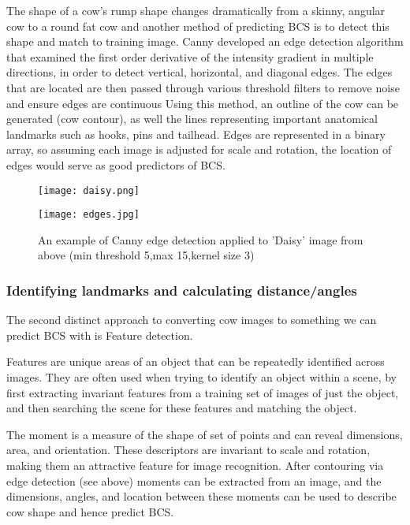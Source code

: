 \documentclass[11pt]{article}
\begin{document}
	The shape of a cow's rump shape changes dramatically from a skinny, angular cow to a round fat cow and another method of predicting BCS is to detect this shape and match to training image.
	Canny developed an edge detection algorithm that examined the first order derivative of the intensity gradient in multiple directions, in order to detect vertical, horizontal, and diagonal edges\cite{Canny1986}.
	The edges that are located are then passed through various threshold filters to remove noise and ensure edges are continuous
	Using this method, an outline of the cow can be generated (cow contour), as well the lines representing important anatomical landmarks such as hooks, pins and tailhead.
	Edges are represented in a binary array, so assuming each image is adjusted for scale and rotation, the location of edges would serve as good predictors of BCS.


	\begin{figure}[h!]
		\centering
		\parbox{5cm}{\texttt{[image: daisy.png]}}
		\parbox{6cm}{\texttt{[image: edges.jpg]}}
		\caption{An example of Canny edge detection applied to 'Daisy' image from above (min threshold 5,max 15,kernel size 3) }
		\label{fig:}
	\end{figure}
\newpage


	\subsubsection{Identifying landmarks and calculating distance/angles}

	The second distinct approach to converting cow images to something we can predict BCS with is Feature detection.


	Features are unique areas of an object that can be repeatedly identified across images.
	They are often used when trying to identify an object within a scene, by first extracting invariant features from a training set of images of just the object, and then searching the scene for these features and matching the object.


	The moment is a measure of the shape of set of points and can reveal dimensions, area, and orientation. 
	These descriptors are invariant to scale and rotation, making them an attractive feature for image recognition.
	After contouring via edge detection (see above) moments can be extracted from an image, and the dimensions, angles, and location between these moments can be used to describe cow shape and hence predict BCS.
\end{document}
